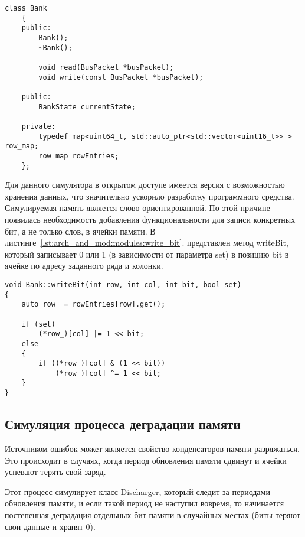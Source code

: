 \begin{lstlisting}[style=cplusplusstyle, caption={Класс Bank}, label=lst:arch_and_mod:modules:bank]
class Bank
    {
    public:
        Bank();
        ~Bank();

        void read(BusPacket *busPacket);
        void write(const BusPacket *busPacket);

    public:
        BankState currentState;

    private:
        typedef map<uint64_t, std::auto_ptr<std::vector<uint16_t>> > row_map;
        row_map rowEntries;
    };
\end{lstlisting}

Для данного симулятора в открытом доступе имеется версия с возможностью хранения данных, что значительно ускорило разработку программного средства. Симулируемая память является слово-ориентированной. По этой причине появилась необходимость добавления функциональности для записи конкретных бит, а не только слов, в ячейки памяти. В листинге~\ref{lst:arch_and_mod:modules:write_bit}. представлен метод writeBit, который записывает 0 или 1 (в зависимости от параметра set) в позицию bit в ячейке по адресу заданного ряда и колонки.

\begin{lstlisting}[style=cplusplusstyle, caption={Метод записи конкретных бит в слове}, label=lst:arch_and_mod:modules:write_bit]
void Bank::writeBit(int row, int col, int bit, bool set)
{
    auto row_ = rowEntries[row].get();

    if (set)
        (*row_)[col] |= 1 << bit;
    else
    {
        if ((*row_)[col] & (1 << bit))
            (*row_)[col] ^= 1 << bit;
    }
}
\end{lstlisting}

\subsection{Симуляция процесса деградации памяти}
\label{sub:arch_and_mod:memory_discharge}

Источником ошибок может является свойство конденсаторов памяти разряжаться. Это происходит в случаях, когда период обновления памяти сдвинут и ячейки успевают терять свой заряд.

Этот процесс симулирует класс Discharger, который следит за периодами обновления памяти, и если такой период не наступил вовремя, то начинается постепенная деградация отдельных бит памяти в случайных местах (биты теряют свои данные и хранят 0). 

